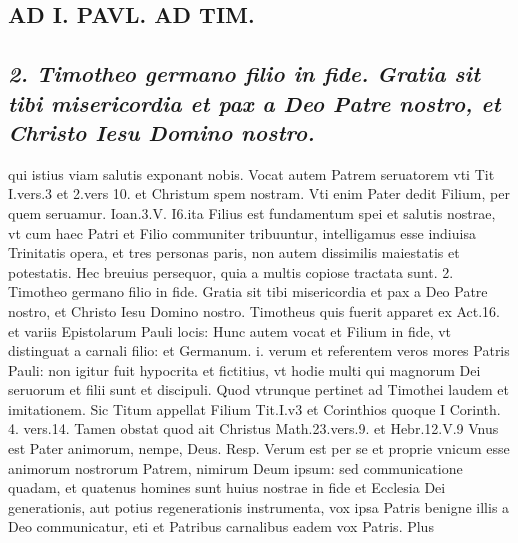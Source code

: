 \documentclass{article}
\begin{document}
\begin{pages}
\section*{AD I. PAVL. AD TIM. }
\marginpar{[ p.4 ]}\pstart {}
{}
\subsection*{\textit{2. Timotheo germano filio in fide. Gratia sit tibi misericordia et pax a Deo Patre nostro, et Christo Iesu Domino nostro.}}qui istius viam salutis exponant nobis. Vocat autem Patrem seruatorem vti Tit I.vers.3 et 2.vers 10. et Christum spem nostram. Vti enim Pater dedit Filium, per quem seruamur. Ioan.3.V. I6.ita Filius est fundamentum spei et salutis nostrae, vt cum haec Patri et Filio communiter tribuuntur, intelligamus esse indiuisa Trinitatis opera, et tres personas paris, non autem dissimilis maiestatis et potestatis. Hec breuius persequor, quia a multis copiose tractata sunt. 2. Timotheo germano filio in fide. Gratia sit tibi misericordia et pax a Deo Patre nostro, et Christo Iesu Domino nostro. Timotheus quis fuerit apparet ex Act.16. et variis Epistolarum Pauli locis: Hunc autem vocat et Filium in fide, vt distinguat a carnali filio: et Germanum. i. verum et referentem veros mores Patris Pauli: non igitur fuit hypocrita et fictitius, vt hodie multi qui magnorum Dei seruorum et filii sunt et discipuli. Quod vtrunque pertinet ad Timothei laudem et imitationem. Sic Titum appellat Filium Tit.I.v3 et Corinthios quoque I Corinth. 4. vers.14. Tamen obstat quod ait Christus Math.23.vers.9. et Hebr.12.V.9 Vnus est Pater animorum, nempe, Deus. Resp. Verum est per se et proprie vnicum esse animorum nostrorum Patrem, nimirum Deum ipsum: sed communicatione quadam, et quatenus homines sunt huius nostrae in fide et Ecclesia Dei generationis, aut potius regenerationis instrumenta, vox ipsa Patris benigne illis a Deo communicatur, eti et Patribus carnalibus eadem vox Patris. Plus  \pend

\end{pages}
\end{document}

